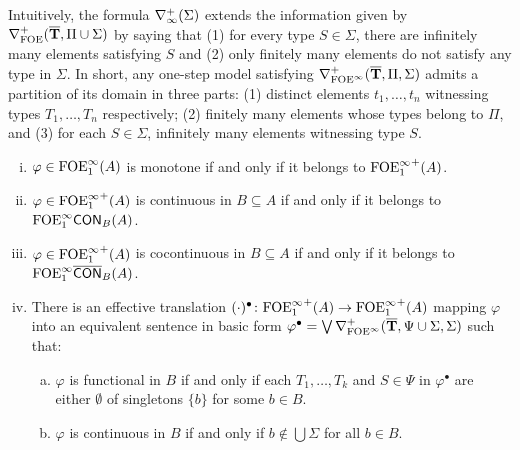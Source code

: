 Intuitively, the formula $\posdbnfinf{\Sigma}$ extends the information given by $\posdbnfofoe{\vlist{T}}{\Pi \cup \Sigma}$ by saying that (1) for every type $S\in\Sigma$, there are infinitely many elements satisfying $S$ and (2) only finitely many elements do not satisfy any type in $\Sigma$. In short, any one-step model satisfying $\posdbnfofoei{\vlist{T}}{\Pi}{\Sigma}$ admits a partition of its domain in three parts: (1) distinct elements $t_1,\dots,t_n$ witnessing types $T_1,\dots,T_n$ respectively; (2) finitely many elements whose types belong to $\Pi$, and (3) for each $S\in \Sigma$, infinitely many elements witnessing type $S$.


\begin{theorem} \label{th:ofoei-normalforms} 
\begin{enumerate}[(i)]
\item $\varphi  \in \ofoei(A)$ is monotone if and only if it belongs to ${\ofoei}^{+}(A)$. 
\item $\varphi  \in {\ofoei}^{+}(A)$ is continuous in $B \subseteq A$ if and only if it belongs to $\cont{\ofoei}{B}(A)$. 
\item $\varphi  \in {\ofoei}^{+}(A)$ is cocontinuous in $B \subseteq A$ if and only if it belongs to $\cocont{\ofoei}{B}(A)$. 
\item There is an effective translation $(\cdot)^{\bullet} \: {\ofoei}^{+}(A) \to {\ofoei}^{+}(A)$ mapping $\varphi$ into an equivalent sentence in basic form $\varphi^{\bullet} = \bigvee \mondbnfofoei{\vlist{T}}{\Psi \cup \Sigma}{\Sigma}{+}$ such that:
\begin{enumerate}[(a)]
\item $\varphi$ is functional in $B$ if and only if each $T_1, \dots, T_k$ and $S \in \Psi$ in $\varphi^{\bullet}$ are either $\emptyset$ of singletons $\{b\}$ for some $b \in B$.
\item $\varphi$ is continuous in $B$ if and only if $b\notin \bigcup\Sigma$ for all $b \in B$.
\end{enumerate}
\end{enumerate}
\end{theorem}

